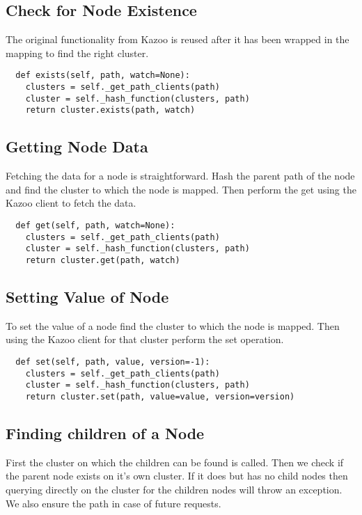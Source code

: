 \subsection{Check for Node Existence}
The original functionality from Kazoo is reused after it has been wrapped in the mapping to find the right cluster.

\begin{lstlisting}
  def exists(self, path, watch=None):
    clusters = self._get_path_clients(path)
    cluster = self._hash_function(clusters, path)
    return cluster.exists(path, watch)
\end{lstlisting}

\subsection{Getting Node Data}
Fetching the data for a node is straightforward. Hash the parent path of the node and find the cluster to which the node is mapped. Then perform the get using the Kazoo client to fetch the data.

\begin{lstlisting}
  def get(self, path, watch=None):
    clusters = self._get_path_clients(path)
    cluster = self._hash_function(clusters, path)
    return cluster.get(path, watch)
\end{lstlisting}


\subsection{Setting Value of Node}
To set the value of a node find the cluster to which the node is mapped. Then using the Kazoo client for that cluster perform the set operation. 

\begin{lstlisting}
  def set(self, path, value, version=-1):
    clusters = self._get_path_clients(path)
    cluster = self._hash_function(clusters, path)
    return cluster.set(path, value=value, version=version)
\end{lstlisting}

\subsection{Finding children of a Node}
First the cluster on which the children can be found is called. Then we check if the parent node exists on it's own cluster. If it does but has no child nodes then querying directly on the cluster for the children nodes will throw an exception. We also ensure the path in case of future requests.

